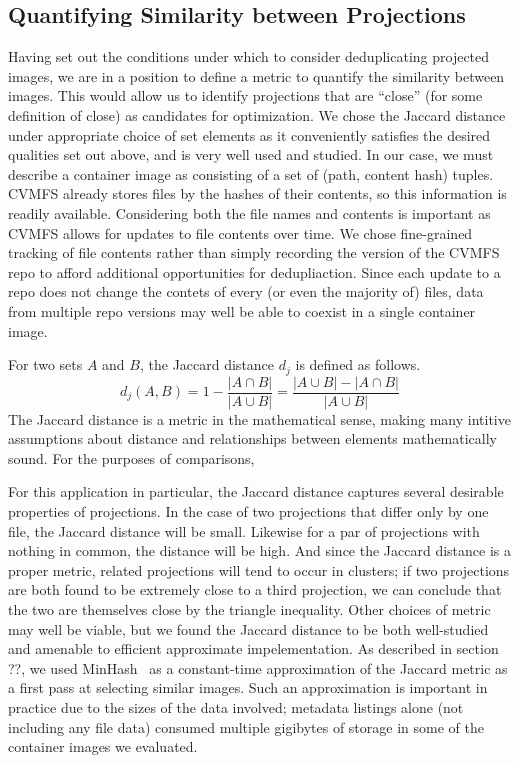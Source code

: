 \documentclass[conference]{IEEEtran}
\begin{document}
\subsection{Quantifying Similarity between Projections}

Having set out the conditions under which to consider deduplicating projected images,
we are in a position to define a metric to quantify the similarity between images.
This would allow us to identify projections that are ``close'' (for some definition of close) as candidates for optimization.
We chose the Jaccard distance under appropriate choice of set elements as it conveniently satisfies the desired qualities set out above,
and is very well used and studied.
In our case, we must describe a container image as consisting of a set of (path, content hash) tuples.
CVMFS already stores files by the hashes of their contents,
so this information is readily available.
Considering both the file names and contents is important as CVMFS allows for updates to file contents over time.
We chose fine-grained tracking of file contents rather than simply recording the version of the CVMFS repo to afford additional opportunities for dedupliaction.
Since each update to a repo does not change the contets of every (or even the majority of) files,
data from multiple repo versions may well be able to coexist in a single container image.

For two sets $A$ and $B$,
the Jaccard distance $d_j$ is defined as follows.
\[
d_j(A, B) = 1 - \frac{|A \cap B|}{|A \cup B|} = \frac{|A \cup B| - |A \cap B|}{|A \cup B|}
\]
The Jaccard distance is a metric in the mathematical sense,
making many intitive assumptions about distance and relationships between elements mathematically sound.
For the purposes of comparisons,

For this application in particular,
the Jaccard distance captures several desirable properties of projections.
In the case of two projections that differ only by one file,
the Jaccard distance will be small.
Likewise for a par of projections with nothing in common,
the distance will be high.
And since the Jaccard distance is a proper metric,
related projections will tend to occur in clusters;
if two projections are both found to be extremely close to a third projection,
we can conclude that the two are themselves close by the triangle inequality.
Other choices of metric may well be viable,
but we found the Jaccard distance to be both well-studied and amenable to efficient approximate impelementation.
As described in section ??,
we used MinHash~\cite{minhash} as a constant-time approximation of the Jaccard metric as a first pass at selecting similar images.
Such an approximation is important in practice due to the sizes of the data involved;
metadata listings alone (not including any file data) consumed multiple gigibytes of storage in some of the container images we evaluated.
\end{document}
